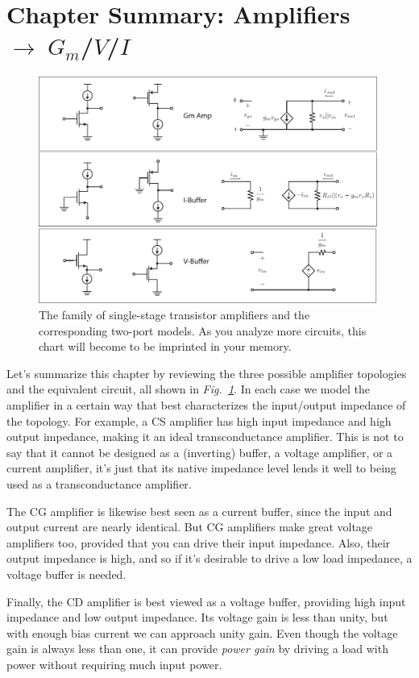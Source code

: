 \section{Chapter Summary: Amplifiers \texorpdfstring{$\rightarrow \; G_m$/$V$/$I$}{}}
\begin{figure}[tb]
\centering
\includegraphics[width=\columnwidth]{ampchart_models}
\caption{The family of single-stage transistor amplifiers and the corresponding two-port models.  As you analyze more circuits, this chart will become to be imprinted in your memory.}
\label{fig:ampchart_models}
\end{figure}
Let's summarize this chapter by reviewing the three possible amplifier topologies and the equivalent circuit, all shown in \emph{Fig.~\ref{fig:ampchart_models}}.  In each case we model the amplifier in a certain way that best characterizes the input/output impedance of the topology.  For example, a CS amplifier has high input impedance and high output impedance, making it an ideal transconductance amplifier.  This is not to say that it cannot be designed as a (inverting) buffer, a voltage amplifier, or a current amplifier, it's just that its native impedance level lends it well to being used as a transconductance amplifier.  

The CG amplifier is likewise best seen as a current buffer, since the input and output current are nearly identical.  But CG amplifiers make great voltage amplifiers too, provided that you can drive their input impedance.  Also, their output impedance is high, and so if it's desirable to drive a low load impedance, a voltage buffer is needed.  

Finally, the CD amplifier is best viewed as a voltage buffer, providing high input impedance and low output impedance.  Its voltage gain is less than unity, but with enough bias current we can approach unity gain.  Even though the voltage gain is always less than one, it can provide \emph{power gain} by driving a load with power without requiring much input power.
